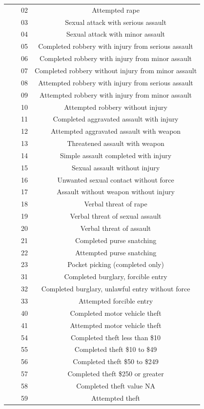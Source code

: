 \documentclass[
]{krantz}
\begin{document}
\begin{longtable}[]{@{}cccc@{}}
& & 02 & Attempted rape \\
& & 03 & Sexual attack with serious assault \\
& & 04 & Sexual attack with minor assault \\
& & 05 & Completed robbery with injury from serious assault \\
& & 06 & Completed robbery with injury from minor assault \\
& & 07 & Completed robbery without injury from minor assault \\
& & 08 & Attempted robbery with injury from serious assault \\
& & 09 & Attempted robbery with injury from minor assault \\
& & 10 & Attempted robbery without injury \\
& & 11 & Completed aggravated assault with injury \\
& & 12 & Attempted aggravated assault with weapon \\
& & 13 & Threatened assault with weapon \\
& & 14 & Simple assault completed with injury \\
& & 15 & Sexual assault without injury \\
& & 16 & Unwanted sexual contact without force \\
& & 17 & Assault without weapon without injury \\
& & 18 & Verbal threat of rape \\
& & 19 & Verbal threat of sexual assault \\
& & 20 & Verbal threat of assault \\
& & 21 & Completed purse snatching \\
& & 22 & Attempted purse snatching \\
& & 23 & Pocket picking (completed only) \\
& & 31 & Completed burglary, forcible entry \\
& & 32 & Completed burglary, unlawful entry without force \\
& & 33 & Attempted forcible entry \\
& & 40 & Completed motor vehicle theft \\
& & 41 & Attempted motor vehicle theft \\
& & 54 & Completed theft less than \$10 \\
& & 55 & Completed theft \$10 to \$49 \\
& & 56 & Completed theft \$50 to \$249 \\
& & 57 & Completed theft \$250 or greater \\
& & 58 & Completed theft value NA \\
& & 59 & Attempted theft \\
\end{longtable}
\end{document}
